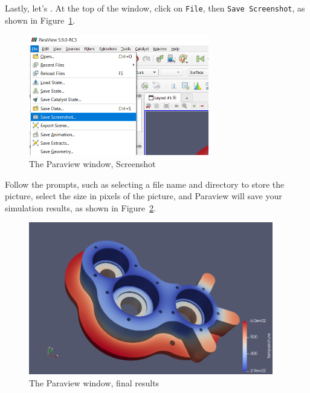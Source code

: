 Lastly, let's .  At the top of the window, click on \texttt{File}, then  \texttt{Save Screenshot}, as shown in Figure~\ref{fg:paraview-4}.

\begin{figure}[H]
\begin{center}
\includegraphics[width=0.7\textwidth]{paraview-4}
\caption{The Paraview window, Screenshot}\label{fg:paraview-4}
\end{center}
\end{figure}

\newpage

Follow the prompts, such as selecting a file name and directory to store the picture, select the size in pixels of the picture, and Paraview will save your simulation results, as shown in Figure~\ref{fg:paraview-5}.

\begin{figure}[H]
\begin{center}
\includegraphics[width=0.95\textwidth]{paraview-5}
\caption{The Paraview window, final results}\label{fg:paraview-5}
\end{center}
\end{figure}

